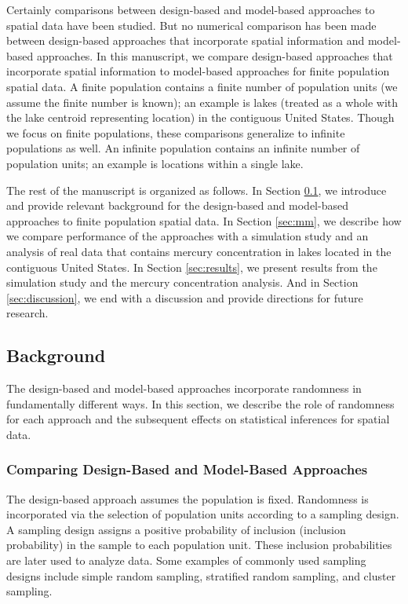 \documentclass[]{elsarticle} %
\begin{document}
Certainly comparisons between design-based and model-based approaches to
spatial data have been studied. But no numerical comparison has been
made between design-based approaches that incorporate spatial
information and model-based approaches. In this manuscript, we compare
design-based approaches that incorporate spatial information to
model-based approaches for finite population spatial data. A finite
population contains a finite number of population units (we assume the
finite number is known); an example is lakes (treated as a whole with
the lake centroid representing location) in the contiguous United
States. Though we focus on finite populations, these comparisons
generalize to infinite populations as well. An infinite population
contains an infinite number of population units; an example is locations
within a single lake.

The rest of the manuscript is organized as follows. In Section
\ref{sec:background}, we introduce and provide relevant background for
the design-based and model-based approaches to finite population spatial
data. In Section \ref{sec:mm}, we describe how we compare performance of
the approaches with a simulation study and an analysis of real data that
contains mercury concentration in lakes located in the contiguous United
States. In Section \ref{sec:results}, we present results from the
simulation study and the mercury concentration analysis. And in Section
\ref{sec:discussion}, we end with a discussion and provide directions
for future research.

\hypertarget{sec:background}{%
\subsection{Background}\label{sec:background}}

The design-based and model-based approaches incorporate randomness in
fundamentally different ways. In this section, we describe the role of
randomness for each approach and the subsequent effects on statistical
inferences for spatial data.

\hypertarget{subsec:dvm_compare}{%
\subsubsection{Comparing Design-Based and Model-Based
Approaches}\label{subsec:dvm_compare}}

The design-based approach assumes the population is fixed. Randomness is
incorporated via the selection of population units according to a
sampling design. A sampling design assigns a positive probability of
inclusion (inclusion probability) in the sample to each population unit.
These inclusion probabilities are later used to analyze data. Some
examples of commonly used sampling designs include simple random
sampling, stratified random sampling, and cluster sampling.
\end{document}
